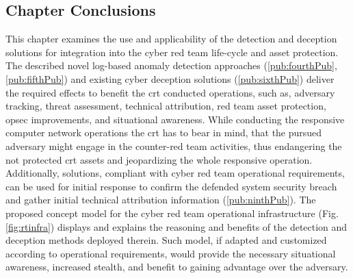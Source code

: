 \subsection{Chapter Conclusions}
This chapter examines the use and applicability of the detection and deception solutions for integration into the cyber red team life-cycle and asset protection. The described novel log-based anomaly detection approaches (\ref{pub:fourthPub}, \ref{pub:fifthPub}) and existing cyber deception solutions (\ref{pub:sixthPub}) deliver the required effects to benefit the \gls{crt} conducted operations, such as, adversary tracking, threat assessment, technical attribution, red team asset protection, \gls{opsec} improvements, and situational awareness. While conducting the responsive computer network operations the \gls{crt} has to bear in mind, that the pursued adversary might engage in the counter-red team activities, thus endangering the not protected \gls{crt} assets and jeopardizing the whole responsive operation. Additionally, solutions, compliant with cyber red team operational requirements, can be used for initial response to confirm the defended system security breach and gather initial technical attribution information (\ref{pub:ninthPub}).
The proposed concept model for the cyber red team operational infrastructure (Fig. \ref{fig:rtinfra}) displays and explains the reasoning and benefits of the detection and deception methods deployed therein. Such model, if adapted and customized according to operational requirements, would provide the necessary situational awareness, increased stealth, and benefit to gaining advantage over the adversary.